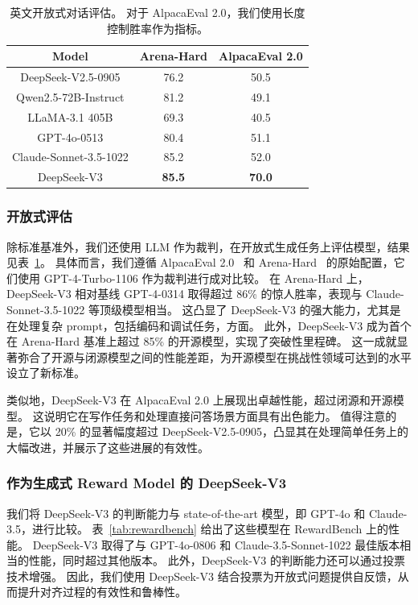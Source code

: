 \documentclass[11pt, a4paper, logo, copyright, nonumbering]{deepseek}
\newcommand{\dsviii}{DeepSeek-V3}
\begin{document}
\begin{table}[t]
    \centering
    \begin{tabular}{c | c c}
    \toprule
    \textbf{Model} & \textbf{Arena-Hard} & \textbf{AlpacaEval 2.0} \\
    \midrule
    DeepSeek-V2.5-0905 & 76.2 & 50.5\\
    Qwen2.5-72B-Instruct & 81.2 & 49.1  \\
    LLaMA-3.1 405B & 69.3 & 40.5\\
    GPT-4o-0513 & 80.4 &  51.1 \\
    Claude-Sonnet-3.5-1022 & 85.2  & 52.0 \\
    DeepSeek-V3 & \textbf{85.5} & \textbf{70.0} \\
    \bottomrule
    \end{tabular}
    \caption{
    英文开放式对话评估。
    对于 AlpacaEval 2.0，我们使用长度控制胜率作为指标。
    }
    \label{tab:open} 
\end{table}

\subsubsection{开放式评估}

除标准基准外，我们还使用 LLM 作为裁判，在开放式生成任务上评估模型，结果见表~\ref{tab:open}。
具体而言，我们遵循 AlpacaEval 2.0~\citep{alpaca2.0} 和 Arena-Hard~\citep{li2024crowdsourced} 的原始配置，它们使用 GPT-4-Turbo-1106 作为裁判进行成对比较。
在 Arena-Hard 上，\dsviii{} 相对基线 GPT-4-0314 取得超过 86\% 的惊人胜率，表现与 Claude-Sonnet-3.5-1022 等顶级模型相当。
这凸显了 \dsviii{} 的强大能力，尤其是在处理复杂 prompt，包括编码和调试任务，方面。
此外，\dsviii{} 成为首个在 Arena-Hard 基准上超过 85\% 的开源模型，实现了突破性里程碑。
这一成就显著弥合了开源与闭源模型之间的性能差距，为开源模型在挑战性领域可达到的水平设立了新标准。

类似地，\dsviii{} 在 AlpacaEval 2.0 上展现出卓越性能，超过闭源和开源模型。
这说明它在写作任务和处理直接问答场景方面具有出色能力。
值得注意的是，它以 20\% 的显著幅度超过 DeepSeek-V2.5-0905，凸显其在处理简单任务上的大幅改进，并展示了这些进展的有效性。

\subsubsection{作为生成式 Reward Model 的 \dsviii{}}

我们将 \dsviii{} 的判断能力与 state-of-the-art 模型，即 GPT-4o 和 Claude-3.5，进行比较。
表~\ref{tab:rewardbench} 给出了这些模型在 RewardBench \citep{lambert2024rewardbench} 上的性能。
\dsviii{} 取得了与 GPT-4o-0806 和 Claude-3.5-Sonnet-1022 最佳版本相当的性能，同时超过其他版本。
此外，\dsviii{} 的判断能力还可以通过投票技术增强。
因此，我们使用 \dsviii{} 结合投票为开放式问题提供自反馈，从而提升对齐过程的有效性和鲁棒性。
\end{document}
